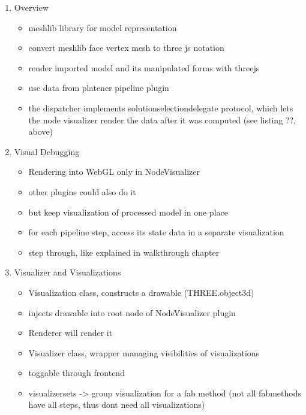 \documentclass[../ClassicThesis.tex]{subfiles}
\begin{document}
\begin{enumerate}
\item Overview
  \begin{itemize}
  \item meshlib library for model representation
  \item convert meshlib face vertex mesh to three js notation
  \item render imported model and its manipulated forms with threejs
  \item use data from platener pipeline plugin
  \item the dispatcher implements solutionselectiondelegate protocol, which
    lets the node visualizer render the data after it was computed (see listing
    ??, above)
  \end{itemize}

\item Visual Debugging
  \begin{itemize}
  \item Rendering into WebGL only in NodeVisualizer
  \item other plugins could also do it
  \item but keep visualization of processed model in one place
  \item for each pipeline step, access its state data in a separate
    visualization
  \item step through, like explained in walkthrough chapter
  \end{itemize}

\item Visualizer and Visualizations
  \begin{itemize}
  \item Visualization class, constructs a drawable (THREE.object3d)
  \item injects drawable into root node of NodeVisualizer plugin
  \item Renderer will render it
  \item Visualizer class, wrapper managing visibilities of visualizations
  \item toggable through frontend
  \item visualizersets -> group visualization for a fab method (not all
    fabmethods have all steps, thus dont need all visualizations)
  \end{itemize}


\end{enumerate}
\end{document}

